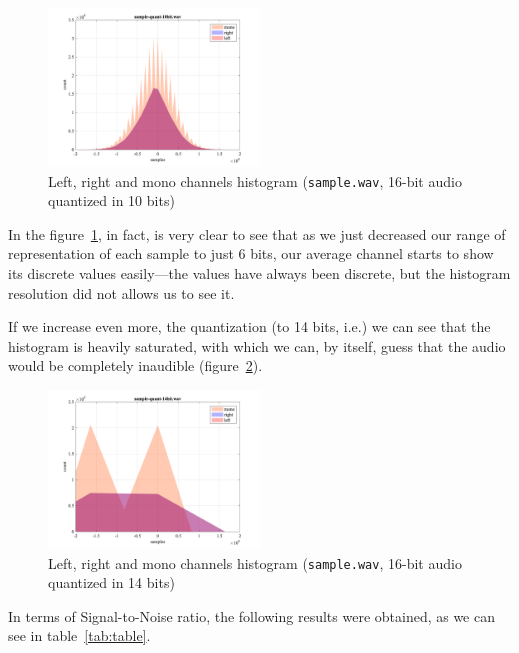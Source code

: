 \documentclass[conference]{IEEEtran}
\begin{document}
\begin{figure}
	\centering
	\includegraphics[width=0.5\textwidth]{figs/10-hist.png}
	\caption{Left, right and mono channels histogram (\texttt{sample.wav}, 16-bit audio quantized in 10 bits)}
    \label{fig:sample-10-hist}
\end{figure}

In the figure~\ref{fig:sample-10-hist}, in fact, is very clear to see that as we just decreased our range of representation of each sample to just 6 bits, our average channel starts to show its discrete values easily—the values have always been discrete, but the histogram resolution did not allows us to see it.

If we increase even more, the quantization (to 14 bits, i.e.) we can see that the histogram is heavily saturated, with which we can, by itself, guess that the audio would be completely inaudible (figure~\ref{fig:sample-14-hist}).

\begin{figure}
	\centering
	\includegraphics[width=0.5\textwidth]{figs/14-hist.png}
	\caption{Left, right and mono channels histogram (\texttt{sample.wav}, 16-bit audio quantized in 14 bits)}
    \label{fig:sample-14-hist}
\end{figure}

In terms of Signal-to-Noise ratio, the following results were obtained, as we can see in table~\ref{tab:table}.
\end{document}
